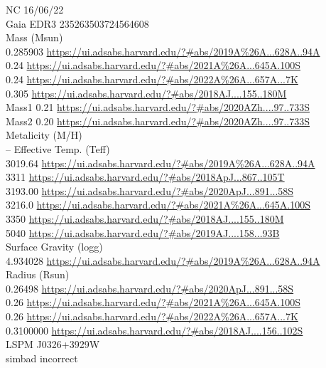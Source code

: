 NC 16/06/22\\
Gaia EDR3 235263503724564608 \\
Mass (Msun)\\
0.285903 \url{https://ui.adsabs.harvard.edu/?#abs/2019A%26A...628A..94A}\\
0.24 \url{https://ui.adsabs.harvard.edu/?#abs/2021A%26A...645A.100S}\\
0.24 \url{https://ui.adsabs.harvard.edu/?#abs/2022A%26A...657A...7K}\\
0.305 \url{https://ui.adsabs.harvard.edu/?#abs/2018AJ....155..180M}\\
Mass1 0.21 \url{https://ui.adsabs.harvard.edu/?#abs/2020AZh....97..733S}\\
Mass2 0.20 \url{https://ui.adsabs.harvard.edu/?#abs/2020AZh....97..733S}\\
Metalicity (M/H)\\
--
Effective Temp. (Teff)\\
3019.64 \url{https://ui.adsabs.harvard.edu/?#abs/2019A%26A...628A..94A}\\
3311 \url{https://ui.adsabs.harvard.edu/?#abs/2018ApJ...867..105T}\\
3193.00 \url{https://ui.adsabs.harvard.edu/?#abs/2020ApJ...891...58S}\\
3216.0 \url{https://ui.adsabs.harvard.edu/?#abs/2021A%26A...645A.100S}\\
3350 \url{https://ui.adsabs.harvard.edu/?#abs/2018AJ....155..180M}\\
5040 \url{https://ui.adsabs.harvard.edu/?#abs/2019AJ....158...93B}\\
Surface Gravity (logg)\\
4.934028 \url{https://ui.adsabs.harvard.edu/?#abs/2019A%26A...628A..94A}\\
Radius (Rsun)\\
0.26498 \url{https://ui.adsabs.harvard.edu/?#abs/2020ApJ...891...58S}\\
0.26 \url{https://ui.adsabs.harvard.edu/?#abs/2021A%26A...645A.100S}\\
0.26 \url{https://ui.adsabs.harvard.edu/?#abs/2022A%26A...657A...7K}\\
0.3100000 \url{https://ui.adsabs.harvard.edu/?#abs/2018AJ....156..102S}\\

LSPM J0326+3929W\\
simbad incorrect